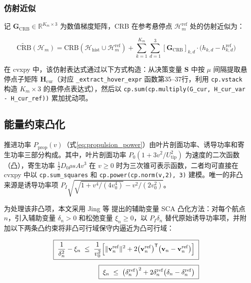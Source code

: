 \subsubsection{仿射近似}

记 $\mathbf{G}_{\mathrm{CRB}}\in\mathbb{R}^{K_m\times 3}$ 为数值梯度矩阵，CRB 在参考悬停点 $\mathcal{H}_m^{\mathrm{ref}}$ 处的仿射近似为：

\begin{equation}
\widetilde{\mathrm{CRB}}(\mathcal{H}_m)=
\mathrm{CRB}(\mathcal{H}_{\mathrm{hist}}\cup\mathcal{H}_m^{\mathrm{ref}})+
\sum_{k=1}^{K_m}\sum_{d=1}^{3}[\mathbf{G}_{\mathrm{CRB}}]_{k,d}\cdot\bigl(h_{k,d}-h_{k,d}^{\mathrm{ref}}\bigr)
\label{eq:crb_affine}
\end{equation}

在 cvxpy 中，该仿射表达式通过以下方式构造：从决策变量 $\mathbf{S}$ 中按 $\mu$ 间隔提取悬停点子矩阵 $\mathbf{H}_{\mathrm{cur}}$（对应 \texttt{\_extract\_hover\_expr} 函数第35--37行，利用 \texttt{cp.vstack} 构造 $K_m\times 3$ 的悬停点表达式），然后以 \texttt{cp.sum(cp.multiply(G\_cur, H\_cur\_var - H\_cur\_ref))} 累加扰动项。

\subsection{能量约束凸化}
\label{sec:energy_convex}

推进功率 $P_{\mathrm{prop}}(v)$（式\eqref{eq:propulsion_power}）由叶片剖面功率、诱导功率和寄生功率三部分构成。其中，叶片剖面功率 $P_0(1+3v^2/U_{\mathrm{tip}}^2)$ 为速度的二次函数（凸），寄生功率 $\frac{1}{2}D_0\rho sA v^3$ 在 $v\geq 0$ 时为三次锥可表示函数，二者均可直接在 cvxpy 中以 \texttt{cp.sum\_squares} 和 \texttt{cp.power(cp.norm(v,2), 3)} 建模。唯一的非凸来源是诱导功率项 $P_I\sqrt{\sqrt{1+v^4/(4v_0^4)}-v^2/(2v_0^2)}$。

为处理该非凸项，本文采用 Jing 等\cite{Jing2022} 提出的辅助变量 SCA 凸化方法：对每个航点 $n$，引入辅助变量 $\delta_n>0$ 和松弛变量 $\xi_n\geq 0$，以 $P_I\delta_n$ 替代原始诱导功率项，并附加以下两条凸约束将非凸可行域保守内逼近为凸可行域：

\begin{align}
\boxed{\;
\frac{1}{\delta_n^2}-\xi_n\;\leq\;
\frac{1}{v_0^2}\Bigl[\|\mathbf{v}_n^{\mathrm{ref}}\|^2+
2\bigl(\mathbf{v}_n^{\mathrm{ref}}\bigr)^{\mathsf{T}}\bigl(\mathbf{v}_n-\mathbf{v}_n^{\mathrm{ref}}\bigr)\Bigr]
\;}\label{eq:constraint_51a}
\\[4pt]
\boxed{\;
\xi_n\;\leq\;\bigl(\delta_n^{\mathrm{ref}}\bigr)^2+
2\delta_n^{\mathrm{ref}}\bigl(\delta_n-\delta_n^{\mathrm{ref}}\bigr)
\;}\label{eq:constraint_51b}
\end{align}

